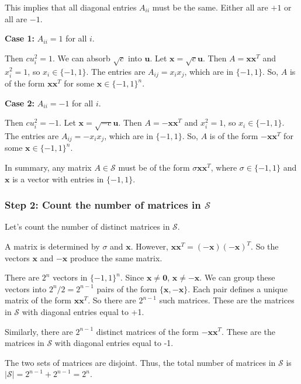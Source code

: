 \documentclass[12pt,a4paper]{article}
\theoremstyle{definition}
\begin{document}
        This implies that all diagonal entries $A_{ii}$ must be the same. Either all are $+1$ or all are $-1$.

        \textbf{Case 1:} $A_{ii} = 1$ for all $i$.

        Then $c u_i^2 = 1$. We can absorb $\sqrt{c}$ into $\mathbf{u}$. Let $\mathbf{x} = \sqrt{c}\mathbf{u}$. Then $A = \mathbf{x}\mathbf{x}^T$ and $x_i^2=1$, so $x_i \in \{-1, 1\}$. The entries are $A_{ij} = x_i x_j$, which are in $\{-1, 1\}$. So, $A$ is of the form $\mathbf{x}\mathbf{x}^T$ for some $\mathbf{x} \in \{-1, 1\}^n$.

        \textbf{Case 2:} $A_{ii} = -1$ for all $i$.

        Then $c u_i^2 = -1$. Let $\mathbf{x} = \sqrt{-c}\mathbf{u}$. Then $A = -\mathbf{x}\mathbf{x}^T$ and $x_i^2=1$, so $x_i \in \{-1, 1\}$. The entries are $A_{ij} = -x_i x_j$, which are in $\{-1, 1\}$. So, $A$ is of the form $-\mathbf{x}\mathbf{x}^T$ for some $\mathbf{x} \in \{-1, 1\}^n$.

        In summary, any matrix $A \in \mathcal{S}$ must be of the form $\sigma \mathbf{x}\mathbf{x}^T$, where $\sigma \in \{-1, 1\}$ and $\mathbf{x}$ is a vector with entries in $\{-1, 1\}$.

        \subsubsection*{Step 2: Count the number of matrices in $\mathcal{S}$}

        Let's count the number of distinct matrices in $\mathcal{S}$.

        A matrix is determined by $\sigma$ and $\mathbf{x}$. However, $\mathbf{x}\mathbf{x}^T = (-\mathbf{x})(-\mathbf{x})^T$. So the vectors $\mathbf{x}$ and $-\mathbf{x}$ produce the same matrix.

        There are $2^n$ vectors in $\{-1, 1\}^n$. Since $\mathbf{x} \neq \mathbf{0}$, $\mathbf{x} \neq -\mathbf{x}$. We can group these vectors into $2^n/2 = 2^{n-1}$ pairs of the form $\{\mathbf{x}, -\mathbf{x}\}$. Each pair defines a unique matrix of the form $\mathbf{x}\mathbf{x}^T$. So there are $2^{n-1}$ such matrices. These are the matrices in $\mathcal{S}$ with diagonal entries equal to +1.

        Similarly, there are $2^{n-1}$ distinct matrices of the form $-\mathbf{x}\mathbf{x}^T$. These are the matrices in $\mathcal{S}$ with diagonal entries equal to -1.

        The two sets of matrices are disjoint. Thus, the total number of matrices in $\mathcal{S}$ is $|\mathcal{S}| = 2^{n-1} + 2^{n-1} = 2^n$.
\end{document}
